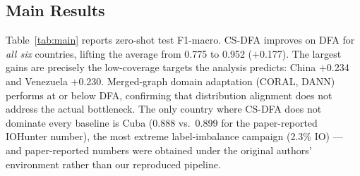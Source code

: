 \documentclass[conference]{IEEEtran}
\newcommand{\method}{CS-DFA}
\begin{document}
\begin{table}[t]
\centering
\caption{Hyperparameters (defaults of the released runner).}
\label{tab:hyper}
\end{table}

\subsection{Main Results}
Table~\ref{tab:main} reports zero-shot test F1-macro. \method{} improves on
DFA for \emph{all six} countries, lifting the average from 0.775 to 0.952
($+$0.177). The largest gains are precisely the low-coverage targets the
analysis predicts: China $+$0.234 and Venezuela $+$0.230. Merged-graph
domain adaptation (CORAL, DANN) performs at or below DFA, confirming that
distribution alignment does not address the actual bottleneck. The only
country where \method{} does not dominate every baseline is Cuba (0.888 vs.\
0.899 for the paper-reported IOHunter number), the most extreme
label-imbalance campaign (2.3\% IO) --- and paper-reported numbers were
obtained under the original authors' environment rather than our reproduced
pipeline.
\end{document}
